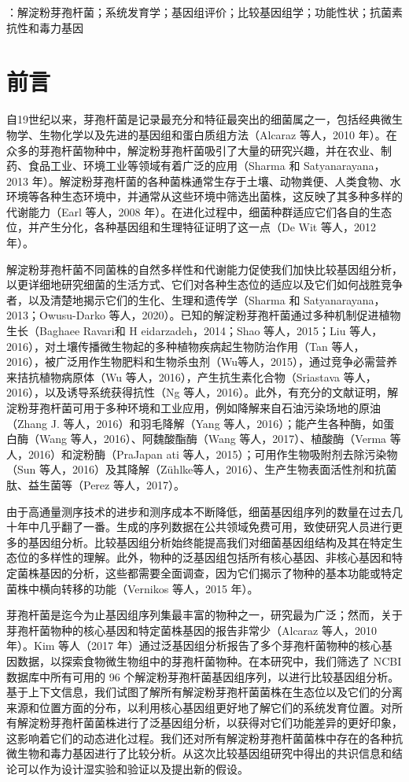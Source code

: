 \documentclass[UTF8]{ctexart}
\begin{document}
{\noindent {}}：解淀粉芽孢杆菌；系统发育学；基因组评价；比较基因组学；功能性状；抗菌素抗性和毒力基因

\section{前言}

自19世纪以来，芽孢杆菌是记录最充分和特征最突出的细菌属之一，包括经典微生物学、生物化学以及先进的基因组和蛋白质组方法（Alcaraz 等人，2010 年）。在众多的芽孢杆菌物种中，解淀粉芽孢杆菌吸引了大量的研究兴趣，并在农业、制药、食品工业、环境工业等领域有着广泛的应用（Sharma 和 Satyanarayana，2013 年）。解淀粉芽孢杆菌的各种菌株通常生存于土壤、动物粪便、人类食物、水环境等各种生态环境中，并通常从这些环境中筛选出菌株，这反映了其多种多样的代谢能力（Earl 等人，2008 年）。在进化过程中，细菌种群适应它们各自的生态位，并产生分化，各种基因组和生理特征证明了这一点（De Wit 等人，2012 年）。

解淀粉芽孢杆菌不同菌株的自然多样性和代谢能力促使我们加快比较基因组分析，以更详细地研究细菌的生活方式、它们对各种生态位的适应以及它们如何战胜竞争者，以及清楚地揭示它们的生化、生理和遗传学（Sharma 和 Satyanarayana，2013；Owusu-Darko 等人，2020）。已知的解淀粉芽孢杆菌通过多种机制促进植物生长（Baghaee Ravari和 H eidarzadeh，2014；Shao 等人，2015；Liu 等人，2016），对土壤传播微生物起的多种植物疾病起生物防治作用（Tan 等人，2016），被广泛用作生物肥料和生物杀虫剂（Wu等人，2015），通过竞争必需营养来拮抗植物病原体（Wu 等人，2016），产生抗生素化合物（Sriastava 等人，2016），以及诱导系统获得抗性（Ng 等人，2016）。此外，有充分的文献证明，解淀粉芽孢杆菌可用于多种环境和工业应用，例如降解来自石油污染场地的原油（Zhang J. 等人，2016）和羽毛降解（Yang 等人，2016）；能产生各种酶，如蛋白酶（Wang 等人，2016）、阿魏酸酯酶（Wang 等人，2017）、植酸酶（Verma 等人，2016）和淀粉酶（PraJapan ati 等人，2015）；可用作生物吸附剂去除污染物（Sun 等人，2016）及其降解（Zühlke等人，2016）、生产生物表面活性剂和抗菌肽、益生菌等（Perez 等人，2017）。

由于高通量测序技术的进步和测序成本不断降低，细菌基因组序列的数量在过去几十年中几乎翻了一番。生成的序列数据在公共领域免费可用，致使研究人员进行更多的基因组分析。比较基因组分析始终能提高我们对细菌基因组结构及其在特定生态位的多样性的理解。此外，物种的泛基因组包括所有核心基因、非核心基因和特定菌株基因的分析，这些都需要全面调查，因为它们揭示了物种的基本功能或特定菌株中横向转移的功能（Vernikos 等人，2015 年）。

芽孢杆菌是迄今为止基因组序列集最丰富的物种之一，研究最为广泛；然而，关于芽孢杆菌物种的核心基因和特定菌株基因的报告非常少（Alcaraz 等人，2010 年）。Kim 等人（2017 年）通过泛基因组分析报告了多个芽孢杆菌物种的核心基因数据，以探索食物微生物组中的芽孢杆菌物种。在本研究中，我们筛选了 NCBI 数据库中所有可用的 96 个解淀粉芽孢杆菌基因组序列，以进行比较基因组分析。基于上下文信息，我们试图了解所有解淀粉芽孢杆菌菌株在生态位以及它们的分离来源和位置方面的分布，以利用核心基因组更好地了解它们的系统发育位置。对所有解淀粉芽孢杆菌菌株进行了泛基因组分析，以获得对它们功能差异的更好印象，这影响着它们的动态进化过程。我们还对所有解淀粉芽孢杆菌菌株中存在的各种抗微生物和毒力基因进行了比较分析。从这次比较基因组研究中得出的共识信息和结论可以作为设计湿实验和验证以及提出新的假设。
\end{document}
